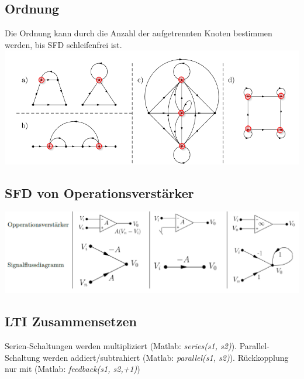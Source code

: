 \subsection{Ordnung}
Die Ordnung kann durch die Anzahl der aufgetrennten Knoten bestimmen werden, bis SFD schleifenfrei ist.\\
\includegraphics[width=\columnwidth]{Images/sfd_ordnung}


\subsection{SFD von Operationsverstärker}
\includegraphics[width=\columnwidth]{"./Images/sfd_op"}


\subsection{LTI Zusammensetzen}
Serien-Schaltungen werden multipliziert (Matlab: \textit{series(s1, s2)}). Parallel-Schaltung werden addiert/subtrahiert (Matlab: \textit{parallel(s1, s2)}). Rückkopplung nur mit (Matlab: \textit{feedback(s1, s2,+1)})